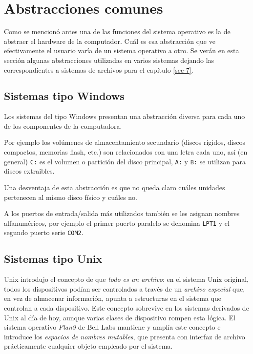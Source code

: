 \documentclass[11pt,fleqn]{book} %
\begin{document}
\section{Abstracciones comunes}
\label{sec-2-8}
\label{HW_abstracciones}


Como se mencionó antes una de las funciones del sistema operativo es
la de abstraer el hardware de la computador. Cuál es esa abstracción
que ve efectivamente el usuario varía de un sistema operativo a otro.
Se verán en esta sección algunas abstracciones utilizadas en varios
sistemas dejando las correspondientes a sistemas de archivos para el 
capítulo \ref{sec-7}.
\subsection{Sistemas tipo Windows}
\label{sec-2-8-1}

Los sistemas del tipo Windows presentan una abstracción diversa
para cada uno de los componentes de la computadora.

Por ejemplo los volúmenes de almacentamiento secundario (discos rígidos, 
discos compactos, memorias flash, etc.) son relacionados 
con una letra cada uno, así (en general) \texttt{C:} es el volumen o partición
del disco principal, \texttt{A:} y \texttt{B:} se utilizan para discos
extraibles.

Una desventaja de esta abstracción es que no queda claro cuáles unidades
pertenecen al mismo disco físico y cuáles no.

A los puertos de entrada/salida más utilizados también se les asignan
nombres alfanuméricos, por ejemplo el primer puerto paralelo se denomina
\texttt{LPT1} y el segundo puerto serie \texttt{COM2}. 
\subsection{Sistemas tipo Unix}
\label{sec-2-8-2}
\label{HW_sist_unix}


Unix introdujo el concepto de que \emph{todo es un archivo}: en el sistema
Unix original, todos los dispositivos podían ser controlados a través
de un \emph{archivo especial} que, en vez de almacenar información, apunta
a estructuras en el sistema que controlan a cada dispositivo. Este
concepto sobrevive en los sistemas derivados de Unix al día de hoy,
aunque varias clases de dispositivo rompen esta lógica. El sistema
operativo \emph{Plan9} de Bell Labs mantiene y amplía este concepto e
introduce los \emph{espacios de nombres mutables}, que presenta con
interfaz de archivo prácticamente cualquier objeto empleado
por el sistema.
\end{document}
